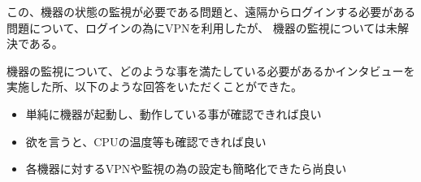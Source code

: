 この、機器の状態の監視が必要である問題と、遠隔からログインする必要がある問題について、ログインの為にVPNを利用したが、
機器の監視については未解決である。

機器の監視について、どのような事を満たしている必要があるかインタビューを実施した所、以下のような回答をいただくことができた。
\begin{itemize}
\item 単純に機器が起動し、動作している事が確認できれば良い
\item 欲を言うと、CPUの温度等も確認できれば良い
\item 各機器に対するVPNや監視の為の設定も簡略化できたら尚良い
\end{itemize}

